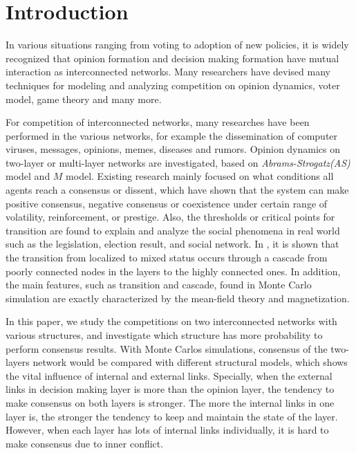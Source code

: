 \documentclass[english]{cccconf}
\begin{document}
\section{Introduction}
In various situations ranging from voting to adoption of new policies, it is widely recognized that opinion formation and decision making formation have mutual interaction as interconnected networks\cite{bianconi2018,domenico2013,tomasini2015, kimsangwoo2012,newman2010,boccaletti2014,mikko2013,huberman2004}. Many researchers have devised many techniques for modeling and analyzing competition on opinion dynamics\cite{amato2017,quattrociocchi2014,haibo2017, hua2014}, voter model\cite{redner2017}, game theory\cite{smyrnakis2019} and many more\cite{danziger2019,namkhanhvu2017,laguna2004,masuda2015,zuev2012, shenyu2018, zhou2018}.  
 
For competition of interconnected networks, many researches have been performed in the various networks, for example the dissemination of computer viruses, messages, opinions, memes, diseases and rumors\cite{hua2014,shenyu2018, zhou2018, alvarez2016,gomez2015,diep2017,rocca2014,velasquez2018}. Opinion dynamics on two-layer or multi-layer networks are investigated, based on \textit{Abrams-Strogatz(AS)} model\cite{abrams2003,vazquez2010} and $M$ model\cite{rocca2014}. Existing research mainly focused on what conditions all agents reach a consensus or dissent, which have shown that the system can make positive consensus, negative consensus or coexistence under certain range of volatility, reinforcement, or prestige. Also, the thresholds or critical points for transition are found to explain and analyze the social phenomena in real world such as the legislation, election result, and social network\cite{alvarez2016, amato2017, diep2017}. In \cite{gomez2015}, it is shown that the transition from localized to mixed status occurs through a cascade from poorly connected nodes in the layers to the highly connected ones. In addition, the main features, such as transition and cascade, found in Monte Carlo simulation are exactly characterized by the mean-field theory and magnetization\cite{alvarez2016, diep2017, amato2017, gomez2015}.   

In this paper, we study the competitions on two interconnected networks with various structures, and investigate which structure has more probability to perform consensus results. With Monte Carlos simulations, consensus of the two-layers network would be compared with different structural models, which shows the vital influence of internal and external links. Specially, when the external links in decision making layer is more than the opinion layer, the tendency to make consensus on both layers is stronger. The more the internal links in one layer is, the stronger the tendency to keep and maintain the state of the layer. However, when each layer has lots of internal links individually, it is hard to make consensus due to inner conflict.    
\end{document}

